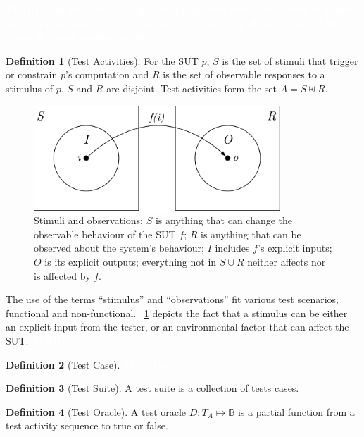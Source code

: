 \documentclass[11pt]{sdm_internship}
\newcommand{\todo}[1]{\colorbox{Red!75}{\textcolor{white}{\textbf{TODO\ifx&#1&\else: #1\fi}}}}
\theoremstyle{definition}
\newtheorem{definition}{Definition}[section]
\begin{document}
\todo{can you add a subjective judgement here? like ``here is a well written definition''}

\begin{definition}[Test Activities]
  For the SUT $p$, $S$ is the set of stimuli that trigger or constrain $p$'s computation and $R$ is the set of observable responses to a stimulus of $p$.
  $S$ and $R$ are disjoint.
  Test activities form the set $A = S\uplus{}R$.
\end{definition}


\begin{figure}
  \centering
  \includegraphics[width=25em]{stim_and_obs}
  \caption{Stimuli and observations: $S$ is anything that can change the observable behaviour of the SUT $f$; $R$ is anything that can be observed about the system's behaviour; $I$ includes $f$'s explicit inputs; $O$ is its explicit outputs; everything not in $S \cup R$ neither affects nor is affected by $f$.}%
  \label{fig:test_activity}
\end{figure}

The use of the terms ``stimulus'' and ``observations'' fit various test scenarios, functional and non-functional.
\figurename~\ref{fig:test_activity} depicts the fact that a stimulus can be either an explicit input from the tester, or an environmental factor that can affect the SUT\@.
\todo{}

\begin{definition}[Test Case]
  \todo{}
\end{definition}

\begin{definition}[Test Suite]
  A test suite is a collection of tests cases.
\end{definition}

\begin{definition}[Test Oracle]
  A test oracle $D : T_A \mapsto \mathbb{B}$ is a partial function from a test activity sequence to true or false.
\end{definition}
\end{document}
